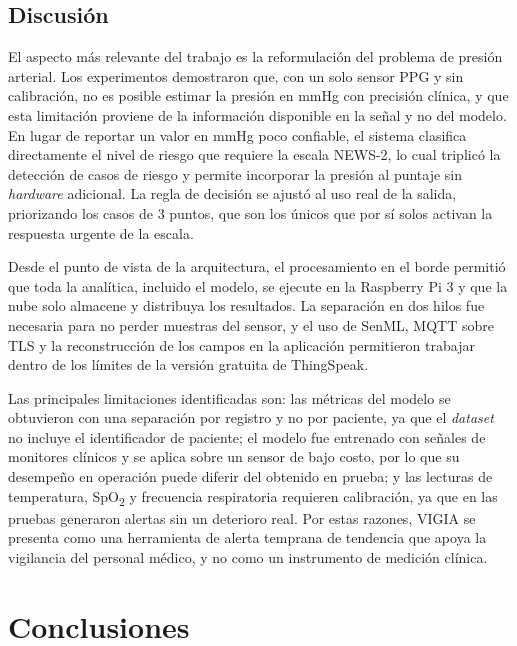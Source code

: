 \documentclass[11pt,a4paper]{article}
\begin{document}
\subsection{Discusión}

El aspecto más relevante del trabajo es la reformulación del problema de presión arterial. Los experimentos demostraron que, con un solo sensor PPG y sin calibración, no es posible estimar la presión en mmHg con precisión clínica, y que esta limitación proviene de la información disponible en la señal y no del modelo. En lugar de reportar un valor en mmHg poco confiable, el sistema clasifica directamente el nivel de riesgo que requiere la escala NEWS-2, lo cual triplicó la detección de casos de riesgo y permite incorporar la presión al puntaje sin \textit{hardware} adicional. La regla de decisión se ajustó al uso real de la salida, priorizando los casos de 3 puntos, que son los únicos que por sí solos activan la respuesta urgente de la escala.

Desde el punto de vista de la arquitectura, el procesamiento en el borde permitió que toda la analítica, incluido el modelo, se ejecute en la Raspberry Pi 3 y que la nube solo almacene y distribuya los resultados. La separación en dos hilos fue necesaria para no perder muestras del sensor, y el uso de SenML, MQTT sobre TLS y la reconstrucción de los campos en la aplicación permitieron trabajar dentro de los límites de la versión gratuita de ThingSpeak.

Las principales limitaciones identificadas son: las métricas del modelo se obtuvieron con una separación por registro y no por paciente, ya que el \textit{dataset} no incluye el identificador de paciente; el modelo fue entrenado con señales de monitores clínicos y se aplica sobre un sensor de bajo costo, por lo que su desempeño en operación puede diferir del obtenido en prueba; y las lecturas de temperatura, SpO\textsubscript{2} y frecuencia respiratoria requieren calibración, ya que en las pruebas generaron alertas sin un deterioro real. Por estas razones, VIGIA se presenta como una herramienta de alerta temprana de tendencia que apoya la vigilancia del personal médico, y no como un instrumento de medición clínica.

\section{Conclusiones}\label{sec:conclusiones}
\end{document}
